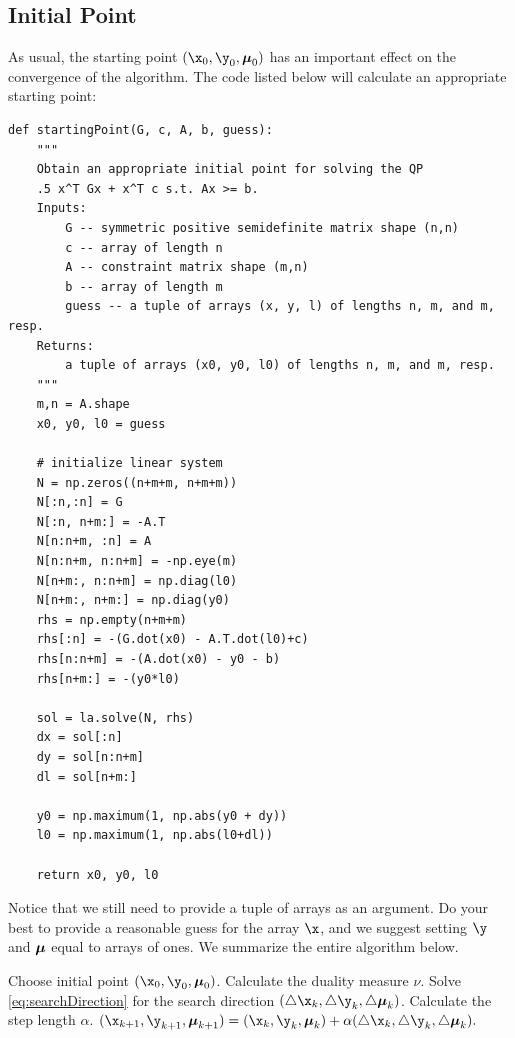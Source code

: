 \subsection*{Initial Point}
As usual, the starting point $(\x_0, \y_0, \Mu_0)$ has an important effect on the convergence of the algorithm.
The code listed below will calculate an appropriate starting point:
\begin{lstlisting}
def startingPoint(G, c, A, b, guess):
    """
    Obtain an appropriate initial point for solving the QP
    .5 x^T Gx + x^T c s.t. Ax >= b.
    Inputs:
        G -- symmetric positive semidefinite matrix shape (n,n)
        c -- array of length n
        A -- constraint matrix shape (m,n)
        b -- array of length m
        guess -- a tuple of arrays (x, y, l) of lengths n, m, and m, resp.
    Returns:
        a tuple of arrays (x0, y0, l0) of lengths n, m, and m, resp.
    """
    m,n = A.shape
    x0, y0, l0 = guess

    # initialize linear system
    N = np.zeros((n+m+m, n+m+m))
    N[:n,:n] = G
    N[:n, n+m:] = -A.T
    N[n:n+m, :n] = A
    N[n:n+m, n:n+m] = -np.eye(m)
    N[n+m:, n:n+m] = np.diag(l0)
    N[n+m:, n+m:] = np.diag(y0)
    rhs = np.empty(n+m+m)
    rhs[:n] = -(G.dot(x0) - A.T.dot(l0)+c)
    rhs[n:n+m] = -(A.dot(x0) - y0 - b)
    rhs[n+m:] = -(y0*l0)

    sol = la.solve(N, rhs)
    dx = sol[:n]
    dy = sol[n:n+m]
    dl = sol[n+m:]

    y0 = np.maximum(1, np.abs(y0 + dy))
    l0 = np.maximum(1, np.abs(l0+dl))

    return x0, y0, l0
\end{lstlisting}
Notice that we still need to provide a tuple of arrays  as an argument.
Do your best to provide a reasonable guess for the array $\x$, and we suggest setting $\y$ and $\boldsymbol{\mu}$ equal to arrays of ones.
We summarize the entire algorithm below.

\begin{algorithm}[H]
\begin{algorithmic}[1]
    \State \textrm{Choose initial point } $(\x_0, \y_0, \Mu_0)$.
        \State \textrm{Calculate the duality measure }$\nu$.
        \State \textrm{Solve \ref{eq:searchDirection} for the search direction } $(\triangle \x_k, \triangle \y_k, \triangle \Mu_k)$.
        \State \textrm{Calculate the step length } $\alpha$.
        \State $(\x_{k+1}, \y_{k+1}, \Mu_{k+1}) = (\x_k, \y_k, \Mu_k) + \alpha(\triangle \x_k, \triangle \y_k, \triangle \Mu_k).$
    \EndWhile
\EndProcedure
\end{algorithmic}
\label{alg:intPt2}
\end{algorithm}

